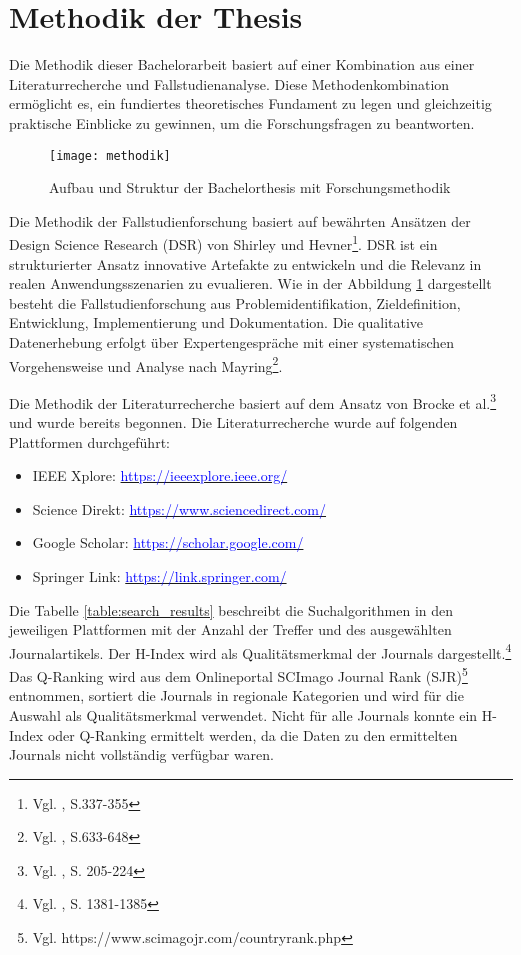 
\section{Methodik der Thesis}

Die Methodik dieser Bachelorarbeit basiert auf einer Kombination aus einer Literaturrecherche und Fallstudienanalyse. Diese Methodenkombination ermöglicht es, ein fundiertes theoretisches Fundament zu legen und gleichzeitig praktische Einblicke zu gewinnen, um die Forschungsfragen zu beantworten.

\begin{figure}[H]
    \centering
    \caption{Aufbau und Struktur der Bachelorthesis mit Forschungsmethodik}
    \texttt{[image: methodik]}
    \captionsetup{font=scriptsize}
    \label{fig:methodik}
\end{figure}

Die Methodik der Fallstudienforschung basiert auf bewährten Ansätzen der Design Science Research (DSR) von Shirley und Hevner\footnote{Vgl. \cite{Shirley&Hevner2013}, S.337-355}. DSR ist ein strukturierter Ansatz innovative Artefakte zu entwickeln und die Relevanz in realen Anwendungsszenarien zu evualieren. Wie in der Abbildung \ref{fig:methodik} dargestellt besteht die Fallstudienforschung aus Problemidentifikation, Zieldefinition, Entwicklung, Implementierung und Dokumentation. Die qualitative Datenerhebung erfolgt über Expertengespräche mit einer systematischen Vorgehensweise und Analyse nach Mayring\footnote{Vgl. \cite{Mayring2019}, S.633-648}. 

Die Methodik der Literaturrecherche basiert auf dem Ansatz von Brocke et al.\footnote{Vgl. \cite{Brocke2015}, S. 205-224} und wurde bereits begonnen. Die Literaturrecherche wurde auf folgenden Plattformen durchgeführt:

\begin{itemize}
    \item IEEE Xplore: \underline{\textcolor{blue}{https://ieeexplore.ieee.org/}}
    \item Science Direkt: \underline{\textcolor{blue}{https://www.sciencedirect.com/}}
    \item Google Scholar: \underline{\textcolor{blue}{https://scholar.google.com/}}
    \item Springer Link: \underline{\textcolor{blue}{https://link.springer.com/}}
\end{itemize}

Die Tabelle \ref{table:search_results} beschreibt die Suchalgorithmen in den jeweiligen Plattformen mit der Anzahl der Treffer und des ausgewählten Journalartikels. Der H-Index wird als Qualitätsmerkmal der Journals dargestellt.\footnote{Vgl. \cite{Bornmann2007}, S. 1381-1385} Das Q-Ranking wird aus dem Onlineportal SCImago Journal Rank (SJR)\footnote{Vgl. https://www.scimagojr.com/countryrank.php } entnommen, sortiert die Journals in regionale Kategorien und wird für die Auswahl als Qualitätsmerkmal verwendet. Nicht für alle Journals konnte ein H-Index oder Q-Ranking ermittelt werden, da die Daten zu den ermittelten Journals nicht vollständig verfügbar waren.

